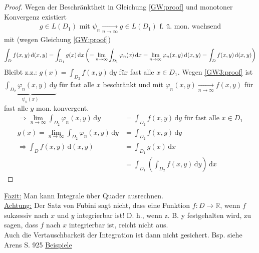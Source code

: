 \begin{proof}
    Wegen der Beschränktheit in Gleichung \ref{GW:proof} und monotoner Konvergenz existiert
    \begin{align}\label{GW3:proof}
        g\in L(D_1) \text{ mit } \psi_n \xrightarrow[n\to\infty]{} g\in L(D_1) \text{ f. ü. mon. wachsend}
    \end{align}
    mit (wegen Gleichung \ref{GW:proof})
    \[\int_D f(x,y) \, \text{d}(x,y) = \int_{D_1} g(x) \, \text{d}x\\
        \left(=\lim_{n \to \infty} \int_{D_1} \varphi_n (x) \, \text{d}x = \lim_{n\to\infty} \varphi_n (x,y) \, \text{d}(x,y) = \int_D f(x,y) \, \text{d}(x,y)\right)\]
    Bleibt z.z.: $g(x) = \int_{D_2} f(x,y) \, \text{d}y$ für fast alle $x\in D_1$. Wegen \ref{GW3:proof} ist $\underbrace{\int_{D_2} \varphi_n (x,y) \, \text{d}y}_{\psi_n (x)}$ für fast alle $x$ beschränkt und mit $\varphi_n (x,y) \xrightarrow[n\to\infty]{} f(x,y)$ für fast alle $y$ mon. konvergent.
    \begin{align*}
        \Rightarrow \lim_{n\to\infty} \int_{D_2} \varphi_n (x,y) \, \text{d}y &= \int_{D_2} f(x,y) \, \text{d}y \text{ für fast alle } x \in D_1\\
        g(x) = \lim_{n\to\infty} \int_{D_2} \varphi_n (x,y) \, \text{d}y &= \int_{D_2} f(x,y) \, \text{d}y\\
        \Rightarrow \int_D f(x,y) \, \text{d}(x,y) &= \int_{D_1} g(x) \, \text{d}x\\
        &= \int_{D_1} \left(\int_{D_2} f(x,y) \, \text{d}y\right) \, \text{d}x
    \end{align*}
\end{proof}
\underline{Fazit:} Man kann Integrale über Quader ausrechnen.\\
\underline{Achtung:} Der Satz von Fubini sagt nicht, dass eine Funktion $f \colon D \to \mathbb{R}$, wenn $f$ sukzessiv nach $x$ und $y$ integrierbar ist! D. h., wenn z. B. y festgehalten wird, zu sagen, dass $f$ nach $x$ integrierbar ist, reicht nicht aus.\\
Auch die Vertauschbarkeit der Integration ist dann nicht gesichert. Bsp. siehe Arens S. 925
\underline{Beispiele}
